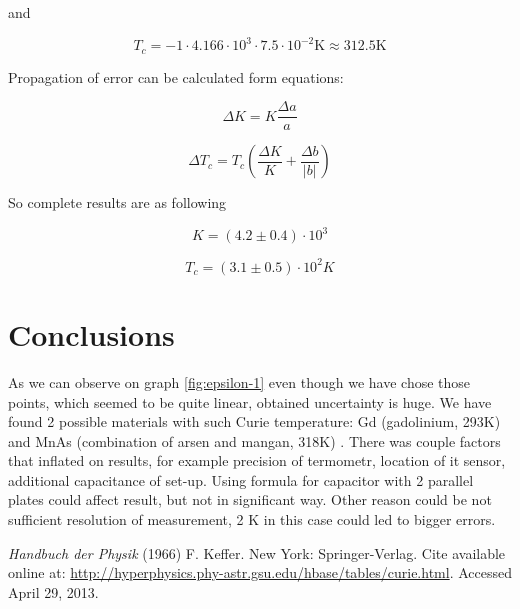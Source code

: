 \documentclass[a4paper,12pt]{article}
\begin{document}
    and 

    \begin{displaymath}
        T_c = -1 \cdot 4.166 \cdot 10^3 \cdot 7.5 \cdot 10^{-2} \mathrm{K} \approx 312.5 \mathrm{K}
    \end{displaymath}

    Propagation of error can be calculated form equations: 

    \begin{equation}
        \Delta K = K \frac{\Delta a}{a}
    \end{equation}
    
    \begin{equation}
        \Delta T_c = T_c \left( \frac{\Delta K}{K} + \frac{\Delta b}{|b|} \right)
    \end{equation}
    
    So complete results are as following

    \begin{displaymath}
        K = (4.2 \pm 0.4) \cdot 10^3
    \end{displaymath}
    
    \begin{displaymath}
        T_c = (3.1 \pm 0.5) \cdot 10 ^ 2 K
    \end{displaymath}
    


    \section{Conclusions}

    As we can observe on graph \ref{fig:epsilon-1} even though we have chose
    those points, which seemed to be quite linear, obtained uncertainty is 
    huge. We have found 2 possible materials with such Curie temperature: 
    Gd (gadolinium, 293K) and MnAs (combination of arsen and mangan, 318K)
    \cite{res}. There was couple factors that inflated on results, for example
    precision of termometr, location of it sensor, additional capacitance of
    set-up. Using formula for capacitor with 2 parallel plates could affect
    result, but not in significant way. Other reason could be not sufficient
    resolution of measurement, 2 K in this case could led to bigger errors.  

    \begin{thebibliography}{9}


        \emph{Handbuch der Physik} (1966) F. Keffer. New York: Springer-Verlag. Cite available online at: \url{http://hyperphysics.phy-astr.gsu.edu/hbase/tables/curie.html}. Accessed April 29, 2013.

    \end{thebibliography}
\end{document}
